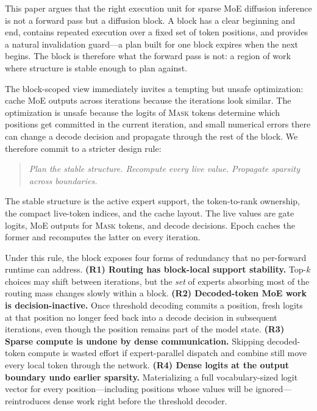 \documentclass[sigconf,review,anonymous, 10pt]{acmart}
\newcommand{\sys}{Epoch}
\newcommand{\mask}{\textsc{Mask}}
\begin{document}
This paper argues that the right execution unit for sparse MoE diffusion inference is not a forward pass but a diffusion block.
A block has a clear beginning and end, contains repeated execution over a fixed set of token positions, and provides a natural invalidation guard---a plan built for one block expires when the next begins.
The block is therefore what the forward pass is not: a region of work where structure is stable enough to plan against.

The block-scoped view immediately invites a tempting but unsafe optimization: cache MoE outputs across iterations because the iterations look similar.
The optimization is unsafe because the logits of \mask{} tokens determine which positions get committed in the current iteration, and small numerical errors there can change a decode decision and propagate through the rest of the block.
We therefore commit to a stricter design rule:

\begin{quote}\emph{Plan the stable structure. Recompute every live value. Propagate sparsity across boundaries.}\end{quote}

\noindent The stable structure is the active expert support, the token-to-rank ownership, the compact live-token indices, and the cache layout.
The live values are gate logits, MoE outputs for \mask{} tokens, and decode decisions.
\sys{} caches the former and recomputes the latter on every iteration.

Under this rule, the block exposes four forms of redundancy that no per-forward runtime can address.
\textbf{(R1) Routing has block-local support stability.} Top-$k$ choices may shift between iterations, but the \emph{set} of experts absorbing most of the routing mass changes slowly within a block.
\textbf{(R2) Decoded-token MoE work is decision-inactive.} Once threshold decoding commits a position, fresh logits at that position no longer feed back into a decode decision in subsequent iterations, even though the position remains part of the model state.
\textbf{(R3) Sparse compute is undone by dense communication.} Skipping decoded-token compute is wasted effort if expert-parallel dispatch and combine still move every local token through the network.
\textbf{(R4) Dense logits at the output boundary undo earlier sparsity.} Materializing a full vocabulary-sized logit vector for every position---including positions whose values will be ignored---reintroduces dense work right before the threshold decoder.
\end{document}
